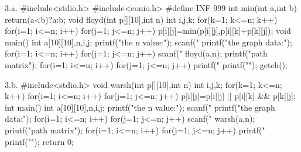 3.a.
#include<stdio.h> 
#include<conio.h> 
#define INF 999 
int min(int a,int b) 
{ 
return(a<b)?a:b; 
} 
void floyd(int p[][10],int n) 
{ 
int i,j,k; 
for(k=1; k<=n; k++) 
for(i=1; i<=n; i++) 
for(j=1; j<=n; j++) 
p[i][j]=min(p[i][j],p[i][k]+p[k][j]); 
} 
void main() 
{ 
int a[10][10],n,i,j; 
printf("\nEnter the n value:"); 
scanf("%
printf("\nEnter the graph data:\n"); 
for(i=1; i<=n; i++) 
for(j=1; j<=n; j++) 
scanf("%
floyd(a,n); 
printf("\nShortest path matrix\n"); 
for(i=1; i<=n; i++) 
{ 
for(j=1; j<=n; j++) 
printf("%
printf("\n"); 
} 
getch(); 
}


3.b.
#include<stdio.h> 
void warsh(int p[][10],int n) 
{ 
int i,j,k; 
for(k=1; k<=n; k++) 
for(i=1; i<=n; i++) 
for(j=1; j<=n; j++) 
p[i][j]=p[i][j] || p[i][k] && p[k][j]; 
} 
int main() 
{ 
int a[10][10],n,i,j; 
printf("\nEnter the n value:"); 
scanf("%
printf("\nEnter the graph data:\n"); 
for(i=1; i<=n; i++) 
for(j=1; j<=n; j++) 
scanf("%
warsh(a,n); 
printf("\nResultant path matrix\n"); 
for(i=1; i<=n; i++) 
{ 
for(j=1; j<=n; j++) 
printf("%
printf("\n"); 
} 
return 0; 
} 
